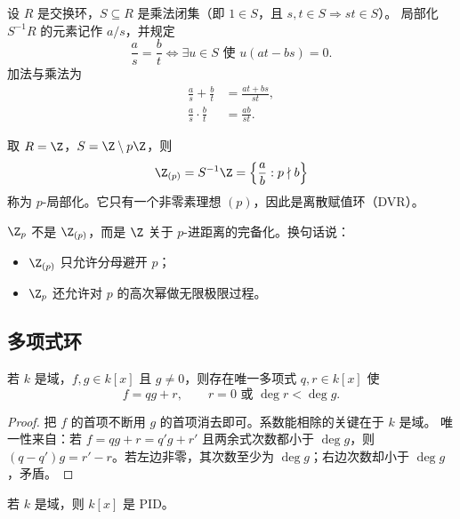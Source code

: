 \begin{definition}[局部化]
设 $R$ 是交换环，$S\subseteq R$ 是乘法闭集（即 $1\in S$，且 $s,t\in S\Rightarrow st\in S$）。
局部化 $S^{-1}R$ 的元素记作 $a/s$，并规定
\[
  \frac{a}{s}=\frac{b}{t}
  \iff \exists u\in S\text{ 使 }u(at-bs)=0.
\]
加法与乘法为
\begin{align}
  \frac{a}{s}+\frac{b}{t}&=\frac{at+bs}{st}, \\
  \frac{a}{s}\cdot \frac{b}{t}&=\frac{ab}{st}.
\end{align}
\end{definition}

\begin{example}
取 $R=\Z$，$S=\Z\setminus p\Z$，则
\begin{equation}
  \Z_{(p)}=S^{-1}\Z=\left\{\frac{a}{b}:p\nmid b\right\}
\end{equation}
称为 $p$-局部化。它只有一个非零素理想 $(p)$，因此是离散赋值环（DVR）。
\end{example}

\begin{proposition}
$\Z_p$ 不是 $\Z_{(p)}$，而是 $\Z$ 关于 $p$-进距离的完备化。换句话说：
\begin{itemize}
  \item $\Z_{(p)}$ 只允许分母避开 $p$；
  \item $\Z_p$ 还允许对 $p$ 的高次幂做无限极限过程。
\end{itemize}
\end{proposition}

\subsection{多项式环}

\begin{proposition}[带余除法]
若 $k$ 是域，$f,g\in k[x]$ 且 $g\neq 0$，则存在唯一多项式 $q,r\in k[x]$ 使
\begin{equation}
  f=qg+r,
  \qquad r=0\text{ 或 }\deg r<\deg g.
\end{equation}
\end{proposition}

\begin{proof}
把 $f$ 的首项不断用 $g$ 的首项消去即可。系数能相除的关键在于 $k$ 是域。
唯一性来自：若 $f=qg+r=q'g+r'$ 且两余式次数都小于 $\deg g$，则
$(q-q')g=r'-r$。若左边非零，其次数至少为 $\deg g$；右边次数却小于 $\deg g$，矛盾。
\end{proof}

\begin{proposition}
若 $k$ 是域，则 $k[x]$ 是 PID。
\end{proposition}

